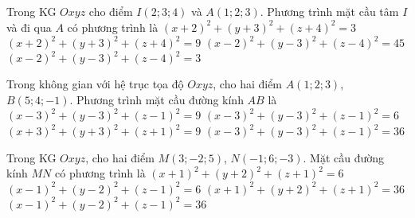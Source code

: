 \begin{ex}%
Trong KG $Oxyz$ cho điểm $I(2;3;4)$ và $A(1;2;3)$. Phương trình mặt cầu tâm $I$ và đi qua $A$ có phương trình là
\choice
{$(x+2)^2+(y+3)^2+(z+4)^2=3$}
{$(x+2)^2+(y+3)^2+(z+4)^2=9$}
{$(x-2)^2+(y-3)^2+(z-4)^2=45$}
{\True $(x-2)^2+(y-3)^2+(z-4)^2=3$}
\end{ex}

\begin{ex}%
Trong không gian với hệ trục tọa độ $Oxyz$, cho hai điểm $A(1;2;3)$, $B(5;4;-1)$. Phương trình mặt cầu đường kính $AB$ là
\choice
{\True $(x-3)^2+(y-3)^2+(z-1)^2=9$}
{$(x-3)^2+(y-3)^2+(z-1)^2=6$}
{$(x+3)^2+(y+3)^2+(z+1)^2=9$}
{$(x-3)^2+(y-3)^2+(z-1)^2=36$}
\end{ex}

\begin{ex}%
Trong KG $Oxyz$, cho hai điểm $M(3;-2;5)$, $N(-1;6;-3)$. Mặt cầu đường kính $MN$ có phương trình là
\choice
{$(x+1)^2+(y+2)^2+(z+1)^2=6$}
{$(x-1)^2+(y-2)^2+(z-1)^2=6$}
{$(x+1)^2+(y+2)^2+(z+1)^2=36$}
{\True $(x-1)^2+(y-2)^2+(z-1)^2=36$}
\end{ex}

